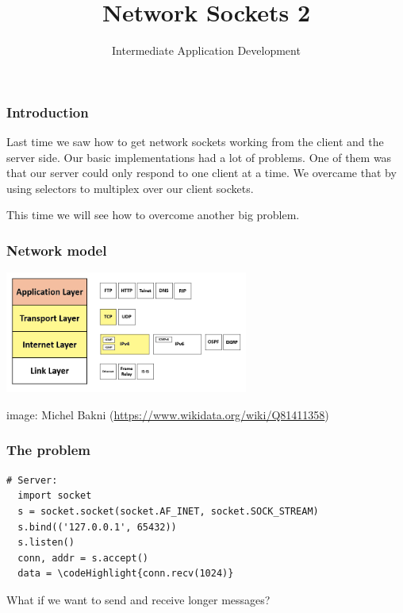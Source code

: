 \documentclass[10pt]{beamer}
\title{Network Sockets 2}
\author[IN608]{Intermediate Application Development}
\institute[Otago Polytechnic]{
  Otago Polytechnic \\
  Dunedin, New Zealand \\
  Kaiako: Tom Clark
}
\date{}
\newcommand\codeHighlight[1]{\textcolor[rgb]{1,0,0}{\textbf{#1}}}
\begin{document}
\begin{frame}[plain]
  \titlepage
\end{frame}

\begin{frame}
  \frametitle{Introduction}
  
  Last time we saw how to get network sockets working from the client and
  the server side. Our basic implementations had a lot of problems. One of them
  was that our server could only respond to one client at a time. We overcame that 
  by using selectors to multiplex over our client sockets.
  
  \vspace{5mm}
  This time we will see how to overcome another big problem.  
  \end{frame}

\begin{frame}
  \frametitle{Network model}
  
  \includegraphics[width=8cm]{tcp-ip.png}
  
  {\tiny image: Michel Bakni (\url{https://www.wikidata.org/wiki/Q81411358})}  
  \end{frame}

\begin{frame}[fragile]
  \frametitle{The problem}
  
  \begin{Verbatim}[commandchars=\\\{\}]
  # Server:                                                                                                       
  import socket                                           
  s = socket.socket(socket.AF_INET, socket.SOCK_STREAM)  
  s.bind(('127.0.0.1', 65432))                          
  s.listen()                                             
  conn, addr = s.accept()                                
  data = \codeHighlight{conn.recv(1024)}                                                                                                                
 \end{Verbatim} 
 
 \vspace{5mm}
 What if we want to send and receive longer messages?
   
\end{frame}
\end{document}
